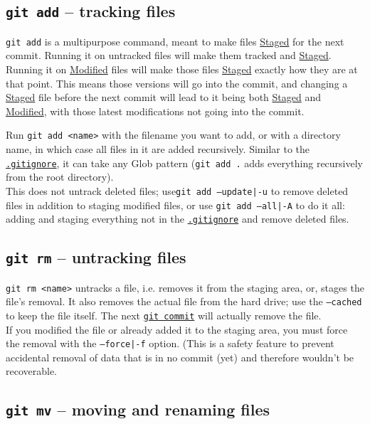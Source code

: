\documentclass[table, xcdraw]{article}%
\begin{document}
\subsection{\texttt{git add} -- tracking files} \label{add}

\texttt{git add} is a multipurpose command, meant to make files \hyperref[states]{Staged} for the next commit. Running it on untracked files will make them tracked and \hyperref[states]{Staged}. Running it on \hyperref[states]{Modified} files will make those files \hyperref[states]{Staged} exactly how they are at that point. This means those versions will go into the commit, and changing a \hyperref[states]{Staged} file before the next commit will lead to it being both \hyperref[states]{Staged} and \hyperref[states]{Modified}, with those latest modifications not going into the commit.

Run \texttt{git add <name>} with the filename you want to add, or with a directory name, in which case all files in it are added recursively. Similar to the \hyperref[gitignore]{\texttt{.gitignore}}, it can take any Glob pattern (\texttt{git add .} adds everything recursively from the root directory).\\
This does not untrack deleted files; use\texttt{git add --update|-u} to remove deleted files in addition to staging modified files, or use \texttt{git add --all|-A} to do it all: adding and staging everything not in the \hyperref[gitignore]{\texttt{.gitignore}} and remove deleted files.

\subsection{\texttt{git rm} -- untracking files} \label{remove}

\texttt{git rm <name>} untracks a file, i.e. removes it from the staging area, or, stages the file's removal. It also removes the actual file from the hard drive; use the \texttt{--cached} to keep the file itself. The next \hyperref[commit]{\texttt{git commit}} will actually remove the file.\\
If you modified the file or already added it to the staging area, you must force the removal with the \texttt{--force|-f} option. (This is a safety feature to prevent accidental removal of data that is in no commit (yet) and therefore wouldn't be recoverable.

\subsection{\texttt{git mv} -- moving and renaming files} \label{move}
\end{document}

